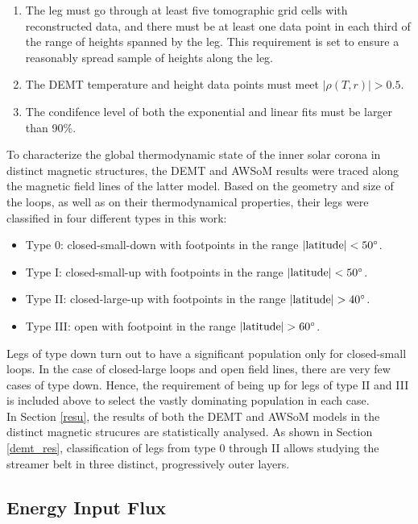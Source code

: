 \documentclass[namedreferences]{solarphysics}
\newcommand{\mdeg}{^\circ}
\newcommand{\rhoTr}{\rho(T,r)}
\begin{document}
\begin{article}
\begin{enumerate}
\item 
The leg must go through at least five tomographic grid cells with reconstructed data, and there must be at least one data point in each third of the range of heights spanned by the leg. {This requirement is set to ensure a reasonably spread sample of heights along the leg.}
\item 
The {DEMT temperature and height data points must meet} $|\rhoTr| > 0.5$.
\item 
{The condifence level of both the exponential and linear fits must be larger than 90\%.} 
\end{enumerate}

{To characterize the global thermodynamic state of the inner solar corona in distinct magnetic structures, the DEMT and AWSoM results were traced along the magnetic field lines of the latter model. Based on the geometry and size of the loops, as well as on their thermodynamical properties, their legs were classified in four different types in this work:} 

\begin{itemize}
\item Type 0: closed-small-down with footpoints in the range $|{\rm latitude}|<50\mdeg$. 
\item Type I: closed-small-up with footpoints in the range $|{\rm latitude}|<50\mdeg$. 
\item Type II: closed-large-up with footpoints in the range $|{\rm latitude}|>40\mdeg$. 
\item Type III: open with footpoint in the range $|{\rm latitude}|>60\mdeg$.
\end{itemize}

{Legs of type down turn out to have a significant population only for closed-small loops. In the case of closed-large loops and open field lines, there are very few cases of type down. Hence, the requirement of being up for legs of type II and III is included above to select the vastly dominating population in each case}. \\
In Section \ref{resu}, the results of both the DEMT and AWSoM models in the distinct magnetic strucures are statistically analysed. {As shown in Section \ref{demt_res}, classification of legs from type 0 through II allows studying the streamer belt in three distinct, progressively outer layers.}

\subsection{{Energy Input Flux}}\label{energia} 


\end{article}
\end{document}

